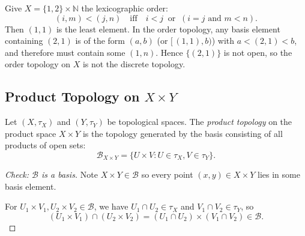 \begin{example}
Give $X=\{1,2\}\times\mathbb{N}$ the lexicographic order:
\[
(i,m)<(j,n)\quad\text{iff}\quad i<j\ \text{ or }\ (i=j\text{ and }m<n).
\]
Then $(1,1)$ is the least element. In the order topology, any basis element containing $(2,1)$ is of the form $(a,b)$ (or $[\, (1,1),b)$)
with $a<(2,1)<b$, and therefore must contain some $(1,n)$. Hence $\{(2,1)\}$ is not open, so the
order topology on $X$ is not the discrete topology.


\end{example}



\subsection{Product Topology on $X\times Y$}

\begin{definition}
  Let $(X,{\tau}_X)$ and $(Y,{\tau}_Y)$ be topological spaces. The \emph{product topology} on the product space $X\times Y$ is the topology generated by the basis consisting of all products of open sets:
  \[
    \mathcal{B}_{X\times Y} = \{ U \times V : U \in {\tau}_X, V \in {\tau}_Y \}.
  \]
\end{definition}

\begin{proof}[Check: $\mathcal{B}$ is a basis]
  Note  $X\times Y\in \mathcal{B}$ so every point $(x,y)\in X\times Y$ lies in some basis element.

  For $U_1\times V_1,U_2\times V_2\in \mathcal{B}$, we have $U_1\cap U_2\in {\tau}_X$ and $V_1\cap V_2\in {\tau}_Y$, so
  \[
    (U_1\times V_1)\cap (U_2\times V_2) = (U_1\cap U_2)\times (V_1\cap V_2)\in \mathcal{B}.
  \]
\end{proof}

